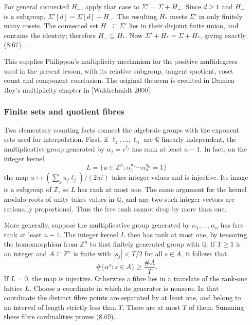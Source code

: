 \documentclass[
  11pt,
  a4paper,
]{article}
\begin{document}
For general connected \(H_-\), apply that case to
\(\Sigma'=\Sigma+H_-\). Since \(d\ge1\) and \(H_-\) is a subgroup,
\(\Sigma'[d]=\Sigma[d]+H_-\). The resulting \(H_*\) meets \(\Sigma'\) in
only finitely many cosets. The connected set \(H_-\subseteq\Sigma'\)
lies in their disjoint finite union, and contains the identity;
therefore \(H_-\subseteq H_*\). Now \(\Sigma'+H_*=\Sigma+H_*\), giving
exactly (8.67). \(\square\)

This supplies Philippon's multiplicity mechanism for the positive
multidegrees used in the present lesson, with its relative subgroup,
tangent quotient, coset count and component conclusion. The original
theorem is credited in Damien Roy's multiplicity chapter in
{[}Waldschmidt 2000{]}.

\subsubsection{Finite sets and quotient
fibres}\label{finite-sets-and-quotient-fibres}

Two elementary counting facts connect the algebraic groups with the
exponent sets used for interpolation. First, if \(\ell_1,\ldots,\ell_n\)
are \(\mathbb Q\)-linearly independent, the multiplicative group
generated by \(\alpha_j=e^{\ell_j}\) has rank at least \(n-1\). In fact,
on the integer kernel \[
L=\{u\in\mathbb Z^n:\alpha_1^{u_1}\cdots\alpha_n^{u_n}=1\}
\] the map \(u\mapsto(\sum_j u_j\ell_j)/(2\pi i)\) takes integer values
and is injective. Its image is a subgroup of \(\mathbb Z\), so \(L\) has
rank at most one. The same argument for the kernel modulo roots of unity
takes values in \(\mathbb Q\), and any two such integer vectors are
rationally proportional. Thus the free rank cannot drop by more than
one.

More generally, suppose the multiplicative group generated by
\(\alpha_1,\ldots,\alpha_n\) has free rank at least \(n-1\). The integer
kernel \(L\) then has rank at most one, by tensoring the homomorphism
from \(\mathbb Z^n\) to that finitely generated group with
\(\mathbb Q\). If \(T\ge1\) is an integer and \(A\subseteq\mathbb Z^n\)
is finite with \(|s_j|<T/2\) for all \(s\in A\), it follows that \[
\#\{\alpha^s:s\in A\}\ge\frac{\#A}{T}.
\tag{8.69}
\] If \(L=0\), the map is injective. Otherwise a fibre lies in a
translate of the rank-one lattice \(L\). Choose a coordinate in which
its generator is nonzero. In that coordinate the distinct fibre points
are separated by at least one, and belong to an interval of length
strictly less than \(T\). There are at most \(T\) of them. Summing these
fibre cardinalities proves (8.69).
\end{document}
